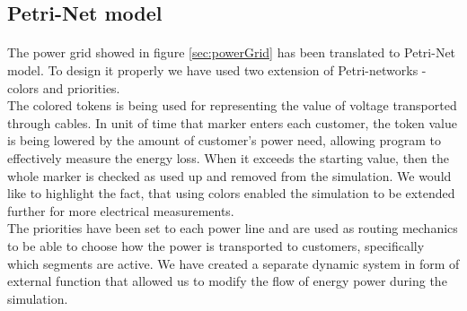 \documentclass[a4paper]{article}
\begin{document}
\subsection{Petri-Net model}
\label{sec:petriNetModel}
\paragraph{}

The power grid showed in figure \ref{sec:powerGrid} has been translated to Petri-Net model. To design it properly we have used two extension of Petri-networks - colors and priorities.\\


The colored tokens is being used for representing the value of voltage transported through cables. In unit of time that marker enters each customer, the token value is being lowered by the amount of customer's power need, allowing program to effectively measure the energy loss. When it exceeds the starting value, then the whole marker is checked as used up and removed from the simulation. We would like to highlight the fact, that using colors enabled the simulation to be extended further for more electrical measurements.\\


The priorities have been set to each power line and are used as routing mechanics to be able to choose how the power is transported to customers, specifically which segments are active. We have created a separate dynamic system in form of external function that allowed us to modify the flow of energy power during the simulation.\\

\end{document}
